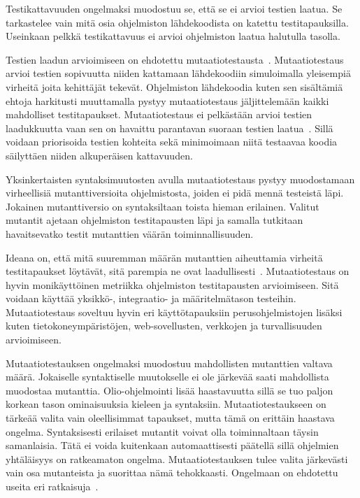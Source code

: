 \documentclass[finnish]{../tktltiki2}
\theoremstyle{definition}
\theoremstyle{remark}
\begin{document}
Testikattavuuden ongelmaksi muodostuu se, että se ei arvioi testien laatua. Se tarkastelee vain mitä osia ohjelmiston 
lähdekoodista on katettu testitapauksilla. Useinkaan pelkkä testikattavuus ei arvioi ohjelmiston laatua halutulla 
tasolla.

    Testien laadun arvioimiseen on ehdotettu mutaatiotestausta~\cite{YH11}. Mutaatiotestaus arvioi testien sopivuutta 
niiden kattamaan lähdekoodiin simuloimalla yleisempiä virheitä joita kehittäjät tekevät. Ohjelmiston lähdekoodia kuten 
sen sisältämiä ehtoja harkitusti muuttamalla pystyy mutaatiotestaus jäljittelemään kaikki mahdolliset testitapaukset. 
Mutaatiotestaus ei pelkästään arvioi testien laadukkuutta vaan sen on havaittu parantavan suoraan testien 
laatua~\cite{YH11}. Sillä voidaan priorisoida testien kohteita sekä minimoimaan niitä testaavaa koodia säilyttäen niiden 
alkuperäisen kattavuuden.

    Yksinkertaisten syntaksimuutosten avulla mutaatiotestaus pystyy muodostamaan virheellisiä mutanttiversioita 
ohjelmistosta, joiden ei pidä mennä testeistä läpi. Jokainen mutanttiversio on syntaksiltaan toista hieman erilainen. 
Valitut mutantit ajetaan ohjelmiston testitapausten läpi ja samalla tutkitaan havaitsevatko testit mutanttien väärän 
toiminnallisuuden.

    Ideana on, että mitä suuremman määrän mutanttien aiheuttamia virheitä testitapaukset löytävät, sitä parempia ne ovat 
laadullisesti~\cite{YH11}. Mutaatiotestaus on hyvin monikäyttöinen metriikka ohjelmiston testitapausten arvioimiseen. 
Sitä voidaan käyttää yksikkö-, integraatio- ja määritelmätason testeihin. Mutaatiotestaus soveltuu hyvin eri 
käyttötapauksiin perusohjelmistojen lisäksi kuten tietokoneympäristöjen, web-sovellusten, verkkojen ja turvallisuuden 
arvioimiseen.

    Mutaatiotestauksen ongelmaksi muodostuu mahdollisten mutanttien valtava määrä. Jokaiselle syntaktiselle muutokselle 
ei ole järkevää saati mahdollista muodostaa mutanttia. Olio-ohjelmointi lisää haastavuutta sillä se tuo paljon korkean 
tason ominaisuuksia kieleen ja syntaksiin. Mutaatiotestaukseen on tärkeää valita vain oleellisimmat tapaukset, mutta 
tämä on erittäin haastava ongelma. Syntaksisesti erilaiset mutantit voivat olla toiminnaltaan täysin samanlaisia. Tätä 
ei voida kuitenkaan automaattisesti päätellä sillä ohjelmien yhtäläisyys on ratkeamaton ongelma. Mutaatiotestauksen 
tulee valita järkevästi vain osa mutanteista ja suorittaa nämä tehokkaasti. Ongelmaan on ehdotettu useita eri 
ratkaisuja~\cite{YH11}.
\end{document}
